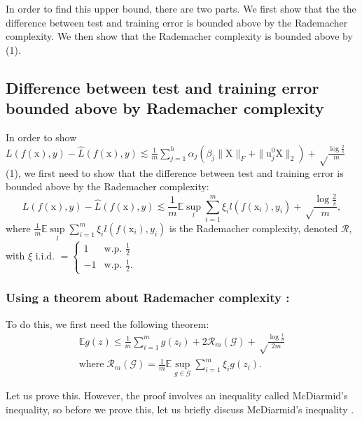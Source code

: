 \documentclass[twoside]{article}
\theoremstyle{definition}
\theoremstyle{definition}
\theoremstyle{remark}
\begin{document}
In order to find this upper bound, there are two parts. We first show that the the difference between test and training error is bounded above by the Rademacher complexity. We then show that the Rademacher complexity is bounded above by (1).

\subsection{Difference between test and training error bounded above by Rademacher complexity}

In order to show $L(f(\text{x}),y) - \hat L(f(\text{x}),y) \lesssim \frac{1}{m} \sum\limits_{j=1}^h \alpha_j (\beta_j \| \text{X} \|_F + \| \text{u}_j^0 \text{X} \|_2) + \sqrt\frac{\log \frac{2}{s}}{m}$ (1), we first need to show that the difference between test and training error is bounded above by the Rademacher complexity:
\begin{equation}
L(f(\text{x}),y) - \hat L(f(\text{x}),y) \lesssim \frac{1}{m} \mathbb{E} \sup \limits_l \sum\limits_{i=1}^m \xi_i l(f(\text{x}_i),y_i) + \sqrt\frac{\log \frac{2}{s}}{m},
\end{equation}
where $\frac{1}{m} \mathbb{E} \sup \limits_l \sum\limits_{i=1}^m \xi_i l(f(\text{x}_i),y_i)$ is the Rademacher complexity, denoted $\mathcal{R}$, with $\xi$ i.i.d. $= \begin{cases} 1 & \text{w.p. } \frac{1}{2} \\ -1 & \text{w.p. } \frac{1}{2}. \end{cases}$

\subsubsection*{Using a theorem about Rademacher complexity \cite[Theorem~3.3]{foundations}:}

To do this, we first need the following theorem:
\[
\begin{aligned}
\mathbb{E} g(z) \leq \frac{1}{m} \sum \limits_{i=1}^m g(z_i) + 2 \mathcal{R}_m(\mathcal{G}) + \sqrt\frac{\log \frac{1}{\delta}}{2m} \\
\text{where} \; \mathcal{R}_m(\mathcal{G}) = \frac{1}{m} \mathbb{E} \sup \limits_{g\in\mathcal{G}} \sum \limits_{i=1}^m \xi_i g(z_i).
\end{aligned}
\]

Let us prove this. However, the proof involves an inequality called McDiarmid's inequality, so before we prove this, let us briefly discuss McDiarmid's inequality \cite{hoeffdingmcdiarmid}.
\end{document}
